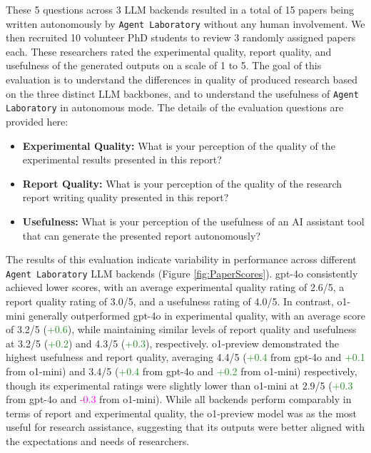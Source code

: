 \documentclass[11pt, a4paper]{gdm_format}
\begin{document}
These 5 questions across 3 LLM backends resulted in a total of 15 papers being written autonomously by \texttt{Agent Laboratory} without any human involvement. We then recruited 10 volunteer PhD students to review 3 randomly assigned papers each. These researchers rated the experimental quality, report quality, and usefulness of the generated outputs on a scale of 1 to 5. The goal of this evaluation is to understand the differences in quality of produced research based on the three distinct LLM backbones, and to understand the usefulness of \texttt{Agent Laboratory} in autonomous mode. The details of the evaluation questions are provided here:

\begin{itemize}
    \item \textbf{Experimental Quality:} What is your perception of the quality of the experimental results presented in this report?
    \item \textbf{Report Quality:} What is your perception of the quality of the research report writing quality presented in this report?
    \item \textbf{Usefulness:} What is your perception of the usefulness of an AI assistant tool that can generate the presented report autonomously?
\end{itemize}



The results of this evaluation indicate variability in performance across different \texttt{Agent Laboratory} LLM backends (Figure \ref{fig:PaperScores}). gpt-4o consistently achieved lower scores, with an average experimental quality rating of 2.6/5, a report quality rating of 3.0/5, and a usefulness rating of 4.0/5. In contrast, o1-mini generally outperformed gpt-4o in experimental quality, with an average score of 3.2/5 (\textcolor{ForestGreen}{+0.6}), while maintaining similar levels of report quality and usefulness at 3.2/5 (\textcolor{ForestGreen}{+0.2}) and 4.3/5 (\textcolor{ForestGreen}{+0.3}), respectively. o1-preview demonstrated the highest usefulness and report quality, averaging 4.4/5 (\textcolor{ForestGreen}{+0.4} from gpt-4o and \textcolor{ForestGreen}{+0.1} from o1-mini) and 3.4/5 (\textcolor{ForestGreen}{+0.4} from gpt-4o and \textcolor{ForestGreen}{+0.2} from o1-mini) respectively, though its experimental ratings were slightly lower than o1-mini at 2.9/5 (\textcolor{ForestGreen}{+0.3} from gpt-4o and \textcolor{Magenta}{-0.3} from o1-mini). While all backends perform comparably in terms of report and experimental quality, the o1-preview model was as the most useful for research assistance, suggesting that its outputs were better aligned with the expectations and needs of researchers. 
\end{document}
